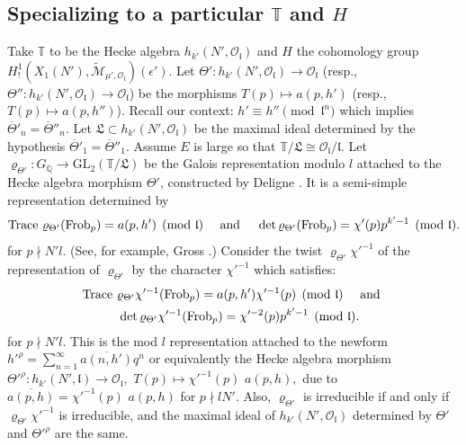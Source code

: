 \documentclass[11pt]{amsart}
\newcommand{\GL}{\mathrm{GL}}
\begin{document}
\subsection{Specializing to a particular $\mathbb{T}$ and $H$}
\label{sec:particular-T-H}
Take $\mathbb{T} $ to be the Hecke algebra $ h_{k'}(N',\mathcal{O}_\mathfrak{l})$ 
and $H$ the cohomology group $H^1_!(X_1(N'), \widetilde{\mathcal{M}}_{\mu', \mathcal{O}_\mathfrak{l}})(\epsilon')$. 
Let $\Theta': h_{k'}(N', \mathcal{O}_\mathfrak{l}) \rightarrow \mathcal{O}_\mathfrak{l}$ 
(resp., $\Theta'': h_{k'}(N', \mathcal{O}_\mathfrak{l}) \rightarrow \mathcal{O}_\mathfrak{l}$) be the morphisms 
$T(p) \mapsto a(p,h')$ (resp., $T(p) \mapsto a(p,h'')$). Recall our context: $h' \equiv h'' \pmod{\mathfrak{l}^n}$ which implies 
$\overline{\Theta}'_n = \overline{\Theta}''_n$. 
Let $\mathfrak{L} \subset h_{k'}(N',\mathcal{O}_\mathfrak{l})$ 
be the maximal ideal determined by the hypothesis $\overline{\Theta}'_1 = \overline{\Theta}''_1.$
Assume $E$ is large so that $\mathbb{T}/\mathfrak{L} \cong  \mathcal{O}_\mathfrak{l}/\mathfrak{l}.$
Let ${\varrho}_{\Theta'} : G_{\mathbb{Q}} \rightarrow \GL_2(\mathbb{T}/\mathfrak{L})$ be the Galois representation modulo $l$ attached to the 
Hecke algebra morphism $\Theta'$, constructed by Deligne \cite{deligne}. It is a semi-simple representation determined by
\begin{equation}
	\textup{Trace} \,\, {\varrho}_{\Theta'}(\textup{Frob}_{p}) = a(p,h') \pmod{\mathfrak{l}}\quad \text{ and } \quad \det{{\varrho}_{\Theta'}(\textup{Frob}_p)} = \chi'(p) p^{k'-1} \pmod{\mathfrak{l}}. 
\end{equation}
for $p\nmid N'l .$ (See, for example, Gross \cite[p.\,483, Prop.\,11.1]{gross}.) 
Consider the twist ${\varrho}_{\Theta'}\chi'^{-1}$ of the representation of ${\varrho}_{\Theta'}$ by the character ${\chi'}^{-1}$ which satisfies: 
\begin{multline}
		\textup{Trace} \,\, {\varrho}_{\Theta'}\chi'^{-1}(\textup{Frob}_{p}) = a(p,h')\chi'^{-1}(p) \pmod{\mathfrak{l}}\quad \text{ and }\\ \quad 
		\det{{\varrho}_{\Theta'}\chi'^{-1}(\textup{Frob}_p)} = \chi'^{-2}(p) p^{k'-1} \pmod{\mathfrak{l}}.
\end{multline}
for $p \nmid N' l.$ This is the mod $l$ representation attached to the newform $h'^\rho = \sum_{n=1}^\infty \overline{a(n,h')}q^n$ 
or equivalently the Hecke algebra morphism 
$\Theta'^\rho: h_{k'}(N', \mathcal{\mathfrak{l}}) \rightarrow \mathcal{O}_\mathfrak{l},\,\, T(p) \mapsto \chi'^{-1}(p)\,\,a(p,h),$ 
due to $\overline{ a(p,h)}= \chi'^{-1}(p)\,\,a(p,h)$ for $p\nmid lN'.$
Also, ${\varrho}_{\Theta'}$ is irreducible if and only if ${\varrho}_{\Theta'}\chi'^{-1}$ is irreducible, and 
the maximal ideal of $h_{k'}(N', \mathcal{O}_\mathfrak{l})$ determined by $\Theta'$ and $\Theta'^\rho$ are the same.
\end{document}
